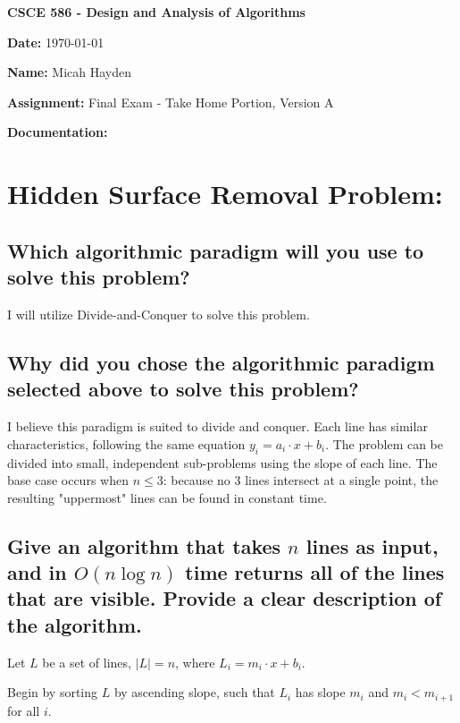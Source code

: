 \documentclass{article}
\begin{document}
\noindent \textbf{CSCE 586 - Design and Analysis of Algorithms}

\noindent \textbf{Date:}  \today 

\noindent \textbf{Name:}  Micah Hayden

\noindent \textbf{Assignment:}  Final Exam - Take Home Portion, Version A

\noindent \textbf{Documentation:} 

\hrulefill

\section{Hidden Surface Removal Problem:}
\subsection{Which algorithmic paradigm will you use to solve this problem?}  
I will utilize Divide-and-Conquer to solve this problem.

\subsection{Why did you chose the algorithmic paradigm selected above to solve this problem?}
I believe this paradigm is suited to divide and conquer.  Each line has similar characteristics, following the same equation $y_i = a_i \cdot x + b_i$.  The problem can be divided into small, independent sub-problems using the slope of each line.  The base case occurs when $n \leq 3$:  because no 3 lines intersect at a single point, the resulting "uppermost" lines can be found in constant time.
 
\subsection{Give an algorithm that takes $n$ lines as input, and in $O(n \log{n})$ time returns all of the lines that are visible.  Provide a clear description of the algorithm.}

Let $L$ be a set of lines, $|L|=n$, where $L_i=m_i \cdot x + b_i$. \newline

\noindent Begin by sorting $L$ by ascending slope, such that $L_i$ has slope $m_i$ and $m_i < m_{i+1}$ for all $i$.
\end{document}
